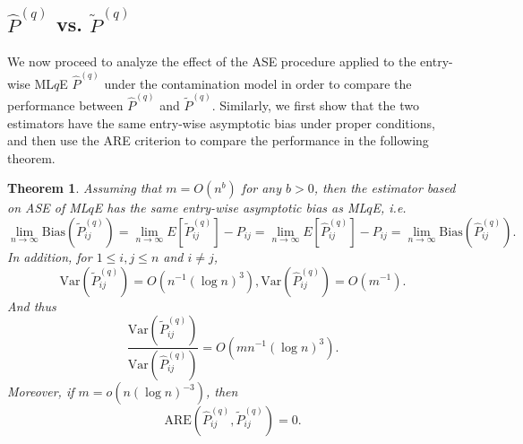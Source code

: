 \documentclass[a4paper]{article}
\newtheorem{theorem}[fact]{Theorem}
\newtheorem{remark}[fact]{Remark}
\renewcommand{\hat}{\widehat}
\begin{document}


\subsection{$\hat{P}^{(q)}$ vs. $\widetilde{P}^{(q)}$}

We now proceed to analyze the effect of the ASE procedure applied to the entry-wise ML$q$E $\hat{P}^{(q)}$ under the contamination model in order to compare the performance between $\hat{P}^{(q)}$ and $\widetilde{P}^{(q)}$. Similarly, we first show that the two estimators have the same entry-wise asymptotic bias under proper conditions, and then use the ARE criterion to compare the performance in the following theorem.

\begin{theorem}
\label{thm:MLqEvsMLqEASE}
Assuming that $m = O(n^b)$ for any $b > 0$, then the estimator based on ASE of ML$q$E has the same entry-wise asymptotic bias as ML$q$E, i.e.
\[
	\lim_{n \to \infty} \mathrm{Bias}(\widetilde{P}_{ij}^{(q)}) = \lim_{n \to \infty} E[\widetilde{P}_{ij}^{(q)}] - P_{ij} = \lim_{n \to \infty} E[\hat{P}^{(q)}_{ij}] - P_{ij}
    = \lim_{n \to \infty} \mathrm{Bias}(\hat{P}_{ij}^{(q)}).
\]
In addition, for $1 \le i, j \le n$ and $i \ne j$,
\[
	\mathrm{Var}(\widetilde{P}_{ij}^{(q)}) = O(n^{-1} (\log n)^3),
	\mathrm{Var}(\hat{P}_{ij}^{(q)}) = O(m^{-1}).
\]
And thus
\[
	\frac{\mathrm{Var}(\widetilde{P}_{ij}^{(q)})}{\mathrm{Var}(\hat{P}_{ij}^{(q)})}
    = O(m n^{-1} (\log n)^3).
\]
Moreover, if $m = o(n (\log n)^{-3})$, then
\[
	\mathrm{ARE}(\hat{P}_{ij}^{(q)}, \widetilde{P}_{ij}^{(q)}) = 0.
\]
\end{theorem}
\end{document}
